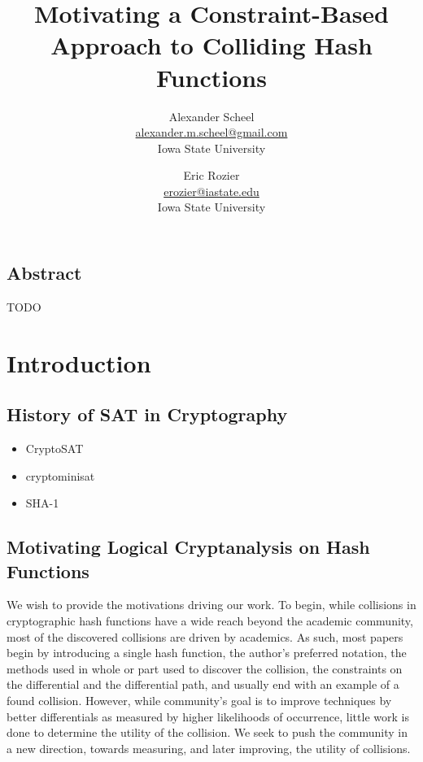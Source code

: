 \documentclass[letterpaper,twocolumn,10pt]{article}
\begin{document}
\date{}

\title{\Large \bf Motivating a Constraint-Based Approach to Colliding Hash Functions }

\author{
{\rm Alexander Scheel}\\
\href{mailto:alexander.m.scheel@gmail.com}{alexander.m.scheel@gmail.com} \\
Iowa State University
\and
{\rm Eric Rozier}\\
\href{mailto:erozier@iastate.edu}{erozier@iastate.edu} \\
Iowa State University
}

\maketitle



\subsection*{Abstract}

TODO

\section{Introduction}
\subsection{History of SAT in Cryptography}

\begin{itemize}
    \item CryptoSAT
    \item cryptominisat
    \item SHA-1
\end{itemize}

\subsection{Motivating Logical Cryptanalysis on Hash Functions}

We wish to provide the motivations driving our work. To begin, while collisions
in cryptographic hash functions have a wide reach beyond the academic community,
most of the discovered collisions are driven by academics. As such, most papers
begin by introducing a single hash function, the author's preferred notation,
the methods used in whole or part used to discover the collision, the constraints
on the differential and the differential path, and usually end with an example of a
found collision. However, while community's goal is to improve techniques by
better differentials as measured by higher likelihoods of occurrence, little work
is done to determine the utility of the collision. We seek to push the
community in a new direction, towards measuring, and later improving, the utility
of collisions.
\end{document}
